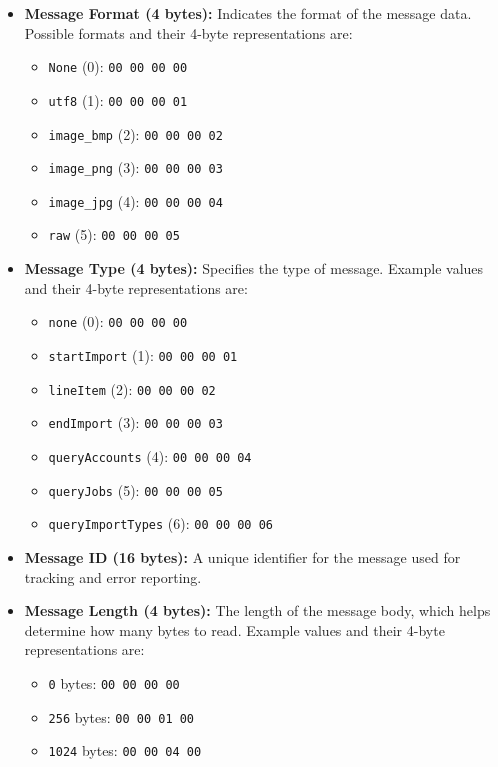 \documentclass{memoir}
\begin{document}
	\begin{itemize}
		\item \textbf{Message Format (4 bytes):} Indicates the format of the message data. Possible formats and their 4-byte representations are:
		\begin{itemize}
			\item \texttt{None} (0): \texttt{00 00 00 00}
			\item \texttt{utf8} (1): \texttt{00 00 00 01}
			\item \texttt{image\_bmp} (2): \texttt{00 00 00 02}
			\item \texttt{image\_png} (3): \texttt{00 00 00 03}
			\item \texttt{image\_jpg} (4): \texttt{00 00 00 04}
			\item \texttt{raw} (5): \texttt{00 00 00 05}
		\end{itemize}
		\item \textbf{Message Type (4 bytes):} Specifies the type of message. Example values and their 4-byte representations are:
		\begin{itemize}
			\item \texttt{none} (0): \texttt{00 00 00 00}
			\item \texttt{startImport} (1): \texttt{00 00 00 01}
			\item \texttt{lineItem} (2): \texttt{00 00 00 02}
			\item \texttt{endImport} (3): \texttt{00 00 00 03}
			\item \texttt{queryAccounts} (4): \texttt{00 00 00 04}
			\item \texttt{queryJobs} (5): \texttt{00 00 00 05}
			\item \texttt{queryImportTypes} (6): \texttt{00 00 00 06}
		\end{itemize}
		\item \textbf{Message ID (16 bytes):} A unique identifier for the message used for tracking and error reporting.
		\item \textbf{Message Length (4 bytes):} The length of the message body, which helps determine how many bytes to read. Example values and their 4-byte representations are:
		\begin{itemize}
			\item \texttt{0} bytes: \texttt{00 00 00 00}
			\item \texttt{256} bytes: \texttt{00 00 01 00}
			\item \texttt{1024} bytes: \texttt{00 00 04 00}
		\end{itemize}
	\end{itemize}
	
\end{document}
